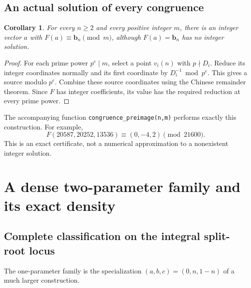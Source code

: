 \documentclass[11pt]{article}
\numberwithin{equation}{section}
\theoremstyle{plain}
\theoremstyle{plain}
\theoremstyle{plain}
\newtheorem{corollary}[corollary]{Corollary}
\theoremstyle{definition}
\theoremstyle{definition}
\theoremstyle{definition}
\theoremstyle{remark}
\newcommand{\target}{\boldsymbol b}
\begin{document}
\subsection{An actual solution of every congruence}
\begin{corollary}\label{alg:cor:congruence}
For every $n\ge2$ and every positive integer $m$, there is an integer
vector $a$ with $F(a)\equiv\target_n\pmod m$, although
$F(a)=\target_n$ has no integer solution.
\end{corollary}
\begin{proof}
For each prime power $p^e\mid m$, select a point $v_i(n)$ with $p\nmid D_i$.
Reduce its integer coordinates normally and its first coordinate by
$D_i^{-1}\bmod p^e$. This gives a source modulo $p^e$. Combine these source
coordinates using the Chinese remainder theorem. Since $F$ has integer
coefficients, its value has the required reduction at every prime power.
\end{proof}
The accompanying function \texttt{congruence\_preimage(n,m)} performs exactly
this construction. For example,
\[
 F(20587,20252,13536)\equiv(0,-4,2)\pmod{21600}.
\]
This is an exact certificate, not a numerical approximation to a nonexistent
integer solution.

\section{A dense two-parameter family and its exact density}\label{alg:sec:plane}

\subsection{Complete classification on the integral split-root locus}
The one-parameter family is the specialization $(a,b,c)=(0,n,1-n)$
of a much larger construction.
\end{document}
